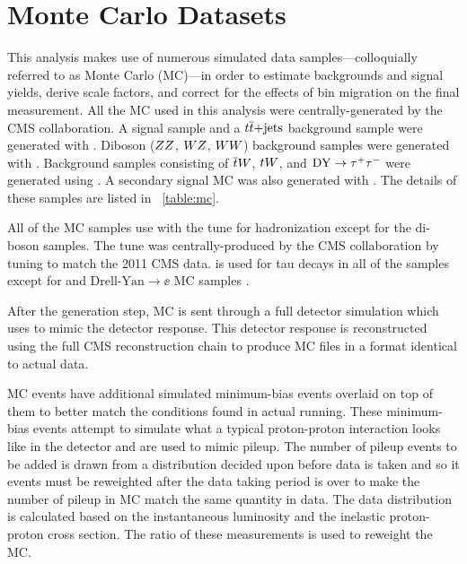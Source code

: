 \section{Monte Carlo Datasets}
\label{ssec:monte_carlo}


This analysis makes use of numerous simulated data samples---colloquially
referred to as Monte Carlo (MC)---in order to estimate backgrounds and signal
yields, derive scale factors, and correct for the effects of bin migration on
the final measurement. All the MC used in this analysis were
centrally-generated by the CMS collaboration. A \DYtoll signal sample and a
$t\overline{t}\text{+jets}$ background sample were generated with \MADGRAPH
\cite{alwall2014}. Diboson ($ZZ$, $WZ$, $WW$) background samples were
generated with \PYTHIAsix \cite{sjostran2006}. Background samples consisting
of $\overline{t} W$, $t W$, and $\text{DY} \to \tau^{+} \tau^{-}$ were generated using \POWHEG
\cite{nason2004}\cite{alioli2010}\cite{re2011}. A secondary signal MC was also
generated with \POWHEG. The details of these samples are listed in
\TAB~\ref{table:mc}.

All of the MC samples use \PYTHIAsix with the \ZTwoStar tune for hadronization
except for the di-boson samples. The \ZTwoStar tune was centrally-produced by
the CMS collaboration by tuning \PYTHIAsix to match the 2011 CMS data. \Tauola
is used for tau decays in all of the samples except for \ttbar and \POWHEG
$\text{Drell-Yan} \to \ee$ MC samples \cite{was_2007}.



After the generation step, MC is sent through a full detector simulation which
uses \GEANTfour \cite{agostinelli2003} to mimic the detector response. This
detector response is reconstructed using the full CMS reconstruction chain to
produce MC files in a format identical to actual data.

MC events have additional simulated minimum-bias events overlaid on top of them
to better match the conditions found in actual running. These minimum-bias
events attempt to simulate what a typical proton-proton interaction looks like
in the detector and are used to mimic pileup. The number of pileup events to be
added is drawn from a distribution decided upon before data is taken and so it
events must be reweighted after the data taking period is over to make the
number of pileup in MC match the same quantity in data. The data distribution
is calculated based on the instantaneous luminosity and the inelastic
proton-proton cross section. The ratio of these measurements is used to
reweight the MC.

